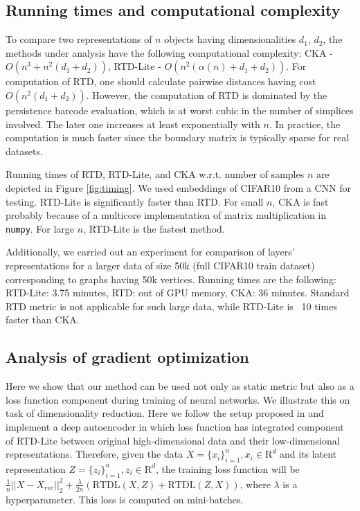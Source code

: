 \documentclass[twoside]{article}
\begin{document}
\subsection{Running times and computational complexity}
To compare two representations of $n$ objects having dimensionalities $d_1$, $d_2$, the methods under analysis have the following computational complexity:
CKA - $O(n^3 + n^2 (d_1 + d_2))$, 
\mbox{RTD-Lite} - $O(n^2 (\alpha(n) + d_1 + d_2))$.
For computation of RTD, one should calculate pairwise distances having cost $O(n^2 (d_1 + d_2))$.
However, the computation of RTD is dominated by the persistence barcode evaluation, which is at worst cubic in the number of simplices involved. The later one increases at least exponentially with $n$. In practice, the computation is much faster since the boundary matrix is typically sparse for real datasets.

Running times of RTD, RTD-Lite, and CKA w.r.t. number of samples $n$ are depicted in Figure \ref{fig:timing}. We used embeddings of CIFAR10 from a CNN for testing. RTD-Lite is significantly faster than RTD.
For small $n$, CKA is fast probably because of a multicore implementation of matrix multiplication in \texttt{numpy}.
For large $n$, RTD-Lite is the fastest method.

Additionally, we carried out an experiment for comparison of layers’ representations for a larger data of size 50k (full CIFAR10 train dataset) corresponding to graphs having 50k vertices. Running times are the following:
RTD-Lite: 3.75 minutes, RTD: out of GPU memory, CKA: 36 minutes. Standard RTD metric is not applicable for such large data, while RTD-Lite is ~10 times faster than CKA.



\subsection{Analysis of gradient optimization}
\label{sec:dim_reduction}

Here we show that our method can be used not only as static metric but also as a loss function component during training of neural networks. We illustrate this on task of dimensionality reduction. Here we follow the setup proposed in \cite{trofimov2023learning} and implement a deep autoencoder in which loss function has integrated component of RTD-Lite between original high-dimensional data and their low-dimensional representations. Therefore, given the data $X = \lbrace x_i\rbrace_{i=1}^{n}, x_i \in \mathrm{R}^d$ and its latent representation $Z = \lbrace z_i\rbrace_{i=1}^{n}, z_i \in \mathrm{R}^d$, the training loss function will be $\frac{1}{n}\lvert\rvert X - X_{rec}\lvert\rvert_2^2 + \frac{\lambda}{2n}\left( \text{RTDL}(X, Z) + \text{RTDL}(Z, X)\right)$, where $\lambda$ is a hyperparameter. This loss is computed on mini-batches.
\end{document}
